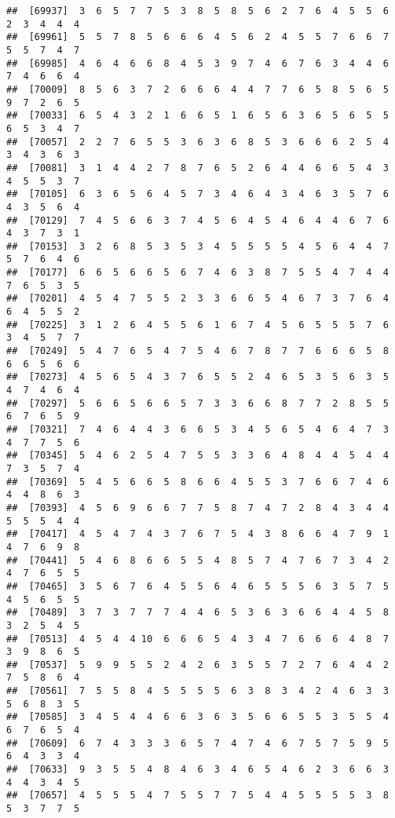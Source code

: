 \documentclass[
]{book}
\begin{document}
\begin{verbatim}
##  [69937]  3  6  5  7  7  5  3  8  5  8  5  6  2  7  6  4  5  5  6  2  3  4  4  4
##  [69961]  5  5  7  8  5  6  6  6  4  5  6  2  4  5  5  7  6  6  7  5  5  7  4  7
##  [69985]  4  6  4  6  6  8  4  5  3  9  7  4  6  7  6  3  4  4  6  7  4  6  6  4
##  [70009]  8  5  6  3  7  2  6  6  6  4  4  7  7  6  5  8  5  6  5  9  7  2  6  5
##  [70033]  6  5  4  3  2  1  6  6  5  1  6  5  6  3  6  5  6  5  5  6  5  3  4  7
##  [70057]  2  2  7  6  5  5  3  6  3  6  8  5  3  6  6  6  2  5  4  3  4  3  6  3
##  [70081]  3  1  4  4  2  7  8  7  6  5  2  6  4  4  6  6  5  4  3  4  5  5  3  7
##  [70105]  6  3  6  5  6  4  5  7  3  4  6  4  3  4  6  3  5  7  6  4  3  5  6  4
##  [70129]  7  4  5  6  6  3  7  4  5  6  4  5  4  6  4  4  6  7  6  4  3  7  3  1
##  [70153]  3  2  6  8  5  3  5  3  4  5  5  5  5  4  5  6  4  4  7  5  7  6  4  6
##  [70177]  6  6  5  6  6  5  6  7  4  6  3  8  7  5  5  4  7  4  4  7  6  5  3  5
##  [70201]  4  5  4  7  5  5  2  3  3  6  6  5  4  6  7  3  7  6  4  6  4  5  5  2
##  [70225]  3  1  2  6  4  5  5  6  1  6  7  4  5  6  5  5  5  7  6  3  4  5  7  7
##  [70249]  5  4  7  6  5  4  7  5  4  6  7  8  7  7  6  6  6  5  8  6  6  5  6  6
##  [70273]  4  5  6  5  4  3  7  6  5  5  2  4  6  5  3  5  6  3  5  4  7  4  6  4
##  [70297]  5  6  6  5  6  6  5  7  3  3  6  6  8  7  7  2  8  5  5  6  7  6  5  9
##  [70321]  7  4  6  4  4  3  6  6  5  3  4  5  6  5  4  6  4  7  3  4  7  7  5  6
##  [70345]  5  4  6  2  5  4  7  5  5  3  3  6  4  8  4  4  5  4  4  7  3  5  7  4
##  [70369]  5  4  5  6  6  5  8  6  6  4  5  5  3  7  6  6  7  4  6  4  4  8  6  3
##  [70393]  4  5  6  9  6  6  7  7  5  8  7  4  7  2  8  4  3  4  4  5  5  5  4  4
##  [70417]  4  5  4  7  4  3  7  6  7  5  4  3  8  6  6  4  7  9  1  4  7  6  9  8
##  [70441]  5  4  6  8  6  6  5  5  4  8  5  7  4  7  6  7  3  4  2  4  7  6  5  5
##  [70465]  3  5  6  7  6  4  5  5  6  4  6  5  5  5  6  3  5  7  5  4  5  6  5  5
##  [70489]  3  7  3  7  7  7  4  4  6  5  3  6  3  6  6  4  4  5  8  3  2  5  4  5
##  [70513]  4  5  4  4 10  6  6  6  5  4  3  4  7  6  6  6  4  8  7  3  9  8  6  5
##  [70537]  5  9  9  5  5  2  4  2  6  3  5  5  7  2  7  6  4  4  2  7  5  8  6  4
##  [70561]  7  5  5  8  4  5  5  5  5  6  3  8  3  4  2  4  6  3  3  5  6  8  3  5
##  [70585]  3  4  5  4  4  6  6  3  6  3  5  6  6  5  5  3  5  5  4  6  7  6  5  4
##  [70609]  6  7  4  3  3  3  6  5  7  4  7  4  6  7  5  7  5  9  5  6  4  3  3  4
##  [70633]  9  3  5  5  4  8  4  6  3  4  6  5  4  6  2  3  6  6  3  4  4  3  4  5
##  [70657]  4  5  5  5  4  7  5  5  7  7  5  4  4  5  5  5  5  3  8  5  3  7  7  5

\end{verbatim}
\end{document}
